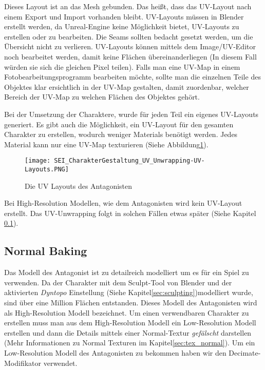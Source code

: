 Dieses Layout ist an das Mesh gebunden. Das heißt, dass das UV-Layout nach einem Export und Import vorhanden bleibt.
UV-Layouts müssen in Blender erstellt werden, da Unreal-Engine keine Möglichkeit bietet, UV-Layouts zu erstellen oder
zu bearbeiten. Die Seams sollten bedacht gesetzt werden, um die Übersicht nicht zu verlieren. UV-Layouts können
mittels dem Image/UV-Editor noch bearbeitet werden, damit keine Flächen übereinanderliegen (In diesem Fall
würden sie sich die gleichen Pixel teilen). Falls man eine UV-Map in einem Fotobearbeitungsprogramm bearbeiten möchte,
sollte man die einzelnen Teile des Objektes klar ersichtlich in der UV-Map gestalten, damit zuordenbar, welcher Bereich
der UV-Map zu welchen Flächen des Objektes gehört.

Bei der Umsetzung der Charaktere, wurde für jeden Teil ein eigenes UV-Layouts generiert. Es gibt auch die Möglichkeit,
ein UV-Layout für den gesamten Charakter zu erstellen, wodurch weniger Materials benötigt werden. Jedes Material kann
nur eine UV-Map texturieren (Siehe Abbildung\ref{picture:uv_layouts}).

\begin{figure}[H]
    \centering
    \texttt{[image: SEI\_CharakterGestaltung\_UV\_Unwrapping-UV-Layouts.PNG]}
    \caption{Die UV Layouts des Antagonisten}
    \label{picture:uv_layouts}
\end{figure}

Bei High-Resolution Modellen, wie dem Antagonisten wird kein UV-Layout erstellt. Das UV-Unwrapping folgt in solchen
Fällen etwas später (Siehe Kapitel \ref{sec:normal_baking}).


\subsection{Normal Baking}
\label{sec:normal_baking}

Das Modell des Antagonist ist zu detailreich modelliert um es für ein Spiel zu verwenden. Da der Charakter mit dem
Sculpt-Tool von Blender und der aktivierten \textit{Dyntopo} Einstellung (Siehe Kapitel\ref{sec:sculpting})modelliert
wurde, sind über eine Million
Flächen entstanden. Dieses Modell des Antagonisten wird als High-Resolution Modell bezeichnet. Um einen verwendbaren
Charakter zu erstellen muss man aus dem High-Resolution Modell ein Low-Resolution Modell erstellen und dann die
Details mittels einer Normal-Textur \textit{gefälscht} darstellen (Mehr Informationen zu Normal Texturen im Kapitel\ref{sec:tex_normal}).
Um ein Low-Resolution Modell des Antagonisten zu bekommen haben wir den Decimate-Modifikator verwendet\citep{blender:mod_decimate}.

